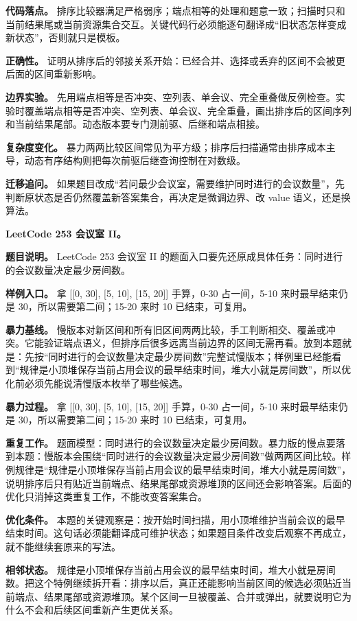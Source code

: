 \textbf{代码落点。} 排序比较器满足严格弱序；端点相等的处理和题意一致；扫描时只和当前结果尾或当前资源集合交互。关键代码行必须能逐句翻译成“旧状态怎样变成新状态”，否则就只是模板。

\textbf{正确性。} 证明从排序后的邻接关系开始：已经合并、选择或丢弃的区间不会被更后面的区间重新影响。

\textbf{边界实验。} 先用端点相等是否冲突、空列表、单会议、完全重叠做反例检查。实验时覆盖端点相等是否冲突、空列表、单会议、完全重叠，画出排序后的区间序列和当前结果尾部。动态版本要专门测前驱、后继和端点相接。

\textbf{复杂度变化。} 暴力两两比较区间常见为平方级；排序后扫描通常由排序成本主导，动态有序结构则把每次前驱后继查询控制在对数级。

\textbf{迁移追问。} 如果题目改成“若问最少会议室，需要维护同时进行的会议数量”，先判断原状态是否仍然覆盖新答案集合，再决定是微调边界、改 value 语义，还是换算法。

\noindent\textbf{LeetCode 253 会议室 II。}

\textbf{题目说明。} LeetCode 253 会议室 II 的题面入口要先还原成具体任务：同时进行的会议数量决定最少房间数。

\textbf{样例入口。} 拿 [[0, 30], [5, 10], [15, 20]] 手算，0-30 占一间，5-10 来时最早结束仍是 30，所以需要第二间；15-20 来时 10 已结束，可复用。

\textbf{暴力基线。} 慢版本对新区间和所有旧区间两两比较，手工判断相交、覆盖或冲突。它能验证端点语义，但排序后很多远离当前边界的区间无需再看。放到本题就是：先按“同时进行的会议数量决定最少房间数”完整试慢版本；样例里已经能看到“规律是小顶堆保存当前占用会议的最早结束时间，堆大小就是房间数”，所以优化前必须先能说清慢版本枚举了哪些候选。

\textbf{暴力过程。} 拿 [[0, 30], [5, 10], [15, 20]] 手算，0-30 占一间，5-10 来时最早结束仍是 30，所以需要第二间；15-20 来时 10 已结束，可复用。

\textbf{重复工作。} 题面模型：同时进行的会议数量决定最少房间数。暴力版的慢点要落到本题：慢版本会围绕“同时进行的会议数量决定最少房间数”做两两区间比较。样例规律是“规律是小顶堆保存当前占用会议的最早结束时间，堆大小就是房间数”，说明排序后只有贴近当前端点、结果尾部或资源堆顶的区间还会影响答案。后面的优化只消掉这类重复工作，不能改变答案集合。

\textbf{优化条件。} 本题的关键观察是：按开始时间扫描，用小顶堆维护当前会议的最早结束时间。这句话必须能翻译成可维护状态；如果题目条件改变后观察不再成立，就不能继续套原来的写法。

\textbf{相邻状态。} 规律是小顶堆保存当前占用会议的最早结束时间，堆大小就是房间数。把这个特例继续拆开看：排序以后，真正还能影响当前区间的候选必须贴近当前端点、结果尾部或资源堆顶。某个区间一旦被覆盖、合并或弹出，就要说明它为什么不会和后续区间重新产生更优关系。

